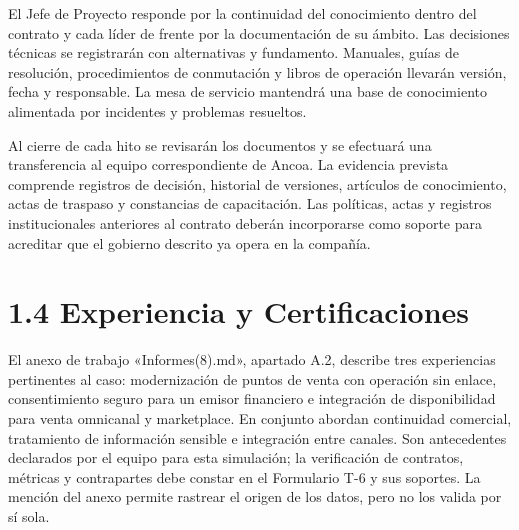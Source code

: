 \documentclass[11pt]{article}
\begin{document}
El Jefe de Proyecto responde por la continuidad del conocimiento dentro del contrato y cada líder de frente por la documentación de su ámbito. Las decisiones técnicas se registrarán con alternativas y fundamento. Manuales, guías de resolución, procedimientos de conmutación y libros de operación llevarán versión, fecha y responsable. La mesa de servicio mantendrá una base de conocimiento alimentada por incidentes y problemas resueltos.

Al cierre de cada hito se revisarán los documentos y se efectuará una transferencia al equipo correspondiente de Ancoa. La evidencia prevista comprende registros de decisión, historial de versiones, artículos de conocimiento, actas de traspaso y constancias de capacitación. Las políticas, actas y registros institucionales anteriores al contrato deberán incorporarse como soporte para acreditar que el gobierno descrito ya opera en la compañía.

\hypertarget{experiencia-y-certificaciones}{%
\section{1.4 Experiencia y Certificaciones}\label{experiencia-y-certificaciones}}

El anexo de trabajo «Informes(8).md», apartado A.2, describe tres experiencias pertinentes al caso: modernización de puntos de venta con operación sin enlace, consentimiento seguro para un emisor financiero e integración de disponibilidad para venta omnicanal y marketplace. En conjunto abordan continuidad comercial, tratamiento de información sensible e integración entre canales. Son antecedentes declarados por el equipo para esta simulación; la verificación de contratos, métricas y contrapartes debe constar en el Formulario T-6 y sus soportes. La mención del anexo permite rastrear el origen de los datos, pero no los valida por sí sola.
\end{document}
